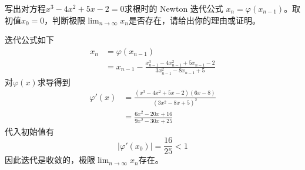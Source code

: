 \documentclass[11pt]{article}
\begin{document}
\begin{question}

    \questiontext
    {
        写出对方程$x^3 - 4x^2 + 5x - 2 =0$求根时的 Newton 迭代公式 $x_n = \varphi(x_{n - 1})$。取初值$x_0 = 0$，判断极限$\displaystyle \lim_{n \rightarrow \infty}{x_n}$是否存在，请给出你的理由或证明。
    }

    \answer
    {
        迭代公式如下
        \begin{align*}
            x_n & = \varphi(x_{n - 1})                                                                            \\
                & = x_{n - 1} - \frac{x_{n - 1}^3 - 4x_{n - 1}^2 + 5x_{n - 1} - 2}{3x_{n - 1}^2 - 8x_{n - 1} + 5}
        \end{align*}
        对$\varphi(x)$求导得到
        \begin{align*}
            \varphi'(x) & = \frac{(x^3 - 4x^2 + 5x - 2)(6x - 8)}{(3x^2 - 8x + 5)^2} \\
                        & = \frac{6x^2 - 20x + 16}{9x^2 - 30x + 25}
        \end{align*}
        代入初始值有
        \begin{equation*}
            \left|\varphi'(x_0)\right| = \frac{16}{25} < 1
        \end{equation*}
        因此迭代是收敛的，极限$\displaystyle \lim_{n \rightarrow \infty}{x_n}$存在。
    }

\end{question}
\end{document}

